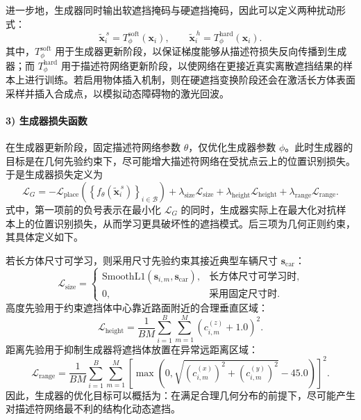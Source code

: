 进一步地，生成器同时输出软遮挡掩码与硬遮挡掩码，因此可以定义两种扰动形式：
\begin{equation}
\tilde{\mathbf{x}}^{\,s}_i=T^{\mathrm{soft}}_{\phi}(\mathbf{x}_i), \qquad
\tilde{\mathbf{x}}^{\,h}_i=T^{\mathrm{hard}}_{\phi}(\mathbf{x}_i).
\label{eq:cn_soft_hard_transform}
\end{equation}
其中，$T^{\mathrm{soft}}_{\phi}$ 用于生成器更新阶段，以保证梯度能够从描述符损失反向传播到生成器；而 $T^{\mathrm{hard}}_{\phi}$ 用于描述符网络更新阶段，以使网络在更接近真实离散遮挡结果的样本上进行训练。若启用物体插入机制，则在硬遮挡变换阶段还会在激活长方体表面采样并插入合成点，以模拟动态障碍物的激光回波。

\paragraph{3) 生成器损失函数}
在生成器更新阶段，固定描述符网络参数 $\theta$，仅优化生成器参数 $\phi$。此时生成器的目标是在几何先验约束下，尽可能增大描述符网络在受扰点云上的位置识别损失。于是生成器损失定义为
\begin{equation}
\mathcal{L}_{G}
=
-\mathcal{L}_{\mathrm{place}}
\left(
\left\{
f_{\theta}\!\left(\tilde{\mathbf{x}}^{\,s}_i\right)
\right\}_{i \in \mathcal{B}}
\right)
+
\lambda_{\mathrm{size}} \mathcal{L}_{\mathrm{size}}
+
\lambda_{\mathrm{height}} \mathcal{L}_{\mathrm{height}}
+
\lambda_{\mathrm{range}} \mathcal{L}_{\mathrm{range}}.
\label{eq:cn_generator_loss}
\end{equation}
式中，第一项前的负号表示在最小化 $\mathcal{L}_{G}$ 的同时，生成器实际上在最大化对抗样本上的位置识别损失，从而学习更具破坏性的遮挡模式。后三项为几何正则约束，其具体定义如下。

若长方体尺寸可学习，则采用尺寸先验约束其接近典型车辆尺寸 $\mathbf{s}_{\mathrm{car}}$：
\begin{equation}
\mathcal{L}_{\mathrm{size}}
=
\begin{cases}
\mathrm{SmoothL1}\!\left(\mathbf{s}_{i,m}, \mathbf{s}_{\mathrm{car}}\right), & \text{长方体尺寸可学习时}, \\
0, & \text{采用固定尺寸时}.
\end{cases}
\label{eq:cn_size_prior}
\end{equation}
高度先验用于约束遮挡体中心靠近路面附近的合理垂直区域：
\begin{equation}
\mathcal{L}_{\mathrm{height}}
=
\frac{1}{BM}
\sum_{i=1}^{B}\sum_{m=1}^{M}
\left(c_{i,m}^{(z)}+1.0\right)^2.
\label{eq:cn_height_prior}
\end{equation}
距离先验用于抑制生成器将遮挡体放置在异常远距离区域：
\begin{equation}
\mathcal{L}_{\mathrm{range}}
=
\frac{1}{BM}
\sum_{i=1}^{B}\sum_{m=1}^{M}
\left[
\max\!\left(
0,\sqrt{\left(c_{i,m}^{(x)}\right)^2+\left(c_{i,m}^{(y)}\right)^2}-45.0
\right)
\right]^2.
\label{eq:cn_range_prior}
\end{equation}
因此，生成器的优化目标可以概括为：在满足合理几何分布的前提下，尽可能产生对描述符网络最不利的结构化动态遮挡。

